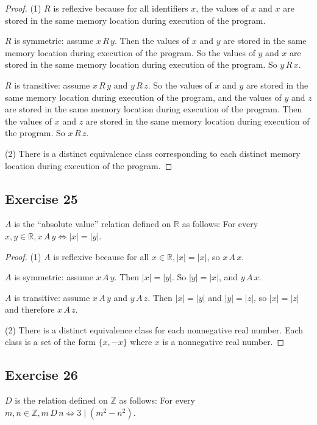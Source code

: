\documentclass[14pt]{extarticle}
\newcommand{\R}{\mathbb{R}}
\newcommand{\Z}{\mathbb{Z}}
\begin{document}
\begin{proof}
        (1) \(R\) is reflexive because for all identifiers \(x\), the values of \(x\) and \(x\) are stored in the same memory
        location during execution of the program.

        \(R\) is symmetric: assume \(x \,R\, y\). Then the values of \(x\) and \(y\) are stored in the same memory
        location during execution of the program. So the values of \(y\) and \(x\) are stored in the same memory location during execution of the program. So \(y \,R\, x\).

        \(R\) is transitive: assume \(x \,R\, y\) and \(y \,R\, z\). So the values of \(x\) and \(y\) are stored in the
        same memory location during execution of the program, and the values of \(y\) and \(z\) are stored in the same memory
        location during execution of the program. Then the values of \(x\) and \(z\) are stored in the same memory location
        during execution of the program. So \(x \,R\, z\).

        (2) There is a distinct equivalence class corresponding to each distinct memory location during execution of the
        program.
\end{proof}

\subsection{Exercise 25}
\(A\) is the “absolute value” relation defined on \(\R\) as follows: For every \(x, y \in \R, x \,A\, y \iff |x| = |y|\).

\begin{proof}
        (1) \(A\) is reflexive because for all \(x \in \R, |x| = |x|\), so \(x \, A \, x\).

        \(A\) is symmetric: assume \(x \,A\, y\). Then \(|x| = |y|\). So \(|y| = |x|\), and \(y \,A\, x\).

        \(A\) is transitive: assume \(x \,A\, y\) and \(y \,A\, z\). Then \(|x| = |y|\) and \(|y| = |z|\), so \(|x| = |z|\)
        and therefore \(x \,A\, z\).

        (2) There is a distinct equivalence class for each nonnegative real number. Each class is a set of the form
        \(\{x, -x\}\) where $x$ is a nonnegative real number.
\end{proof}

\subsection{Exercise 26}
$D$ is the relation defined on \(\Z\) as follows: For every \(m, n \in \Z, m \,D\, n \iff 3 \mid (m^2 - n^2)\).
\end{document}
